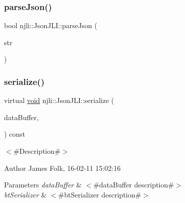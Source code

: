 \mbox{\label{classnjli_1_1_json_j_l_i_ac6c67daeea7d4b60ca3cd20f7a8403d5}} 
\subsubsection{\texorpdfstring{parse\+Json()}{parseJson()}}
{\footnotesize\ttfamily bool njli\+::\+Json\+J\+L\+I\+::parse\+Json (\begin{DoxyParamCaption}\item[{const char $\ast$}]{str }\end{DoxyParamCaption})}

\mbox{\label{classnjli_1_1_json_j_l_i_aa1e476cfc10ae610e4c9b8a62a5c2114}} 
\subsubsection{\texorpdfstring{serialize()}{serialize()}}
{\footnotesize\ttfamily virtual \mbox{\hyperlink{_thread_8h_af1e856da2e658414cb2456cb6f7ebc66}{void}} njli\+::\+Json\+J\+L\+I\+::serialize (\begin{DoxyParamCaption}\item[{\mbox{\hyperlink{_thread_8h_af1e856da2e658414cb2456cb6f7ebc66}{void}} $\ast$}]{data\+Buffer,  }\item[{bt\+Serializer $\ast$}]{ }\end{DoxyParamCaption}) const\hspace{0.3cm}{\ttfamily [virtual]}}



$<$\#\+Description\#$>$ 

\begin{DoxyAuthor}{Author}
James Folk, 16-\/02-\/11 15\+:02\+:16
\end{DoxyAuthor}

\begin{DoxyParams}{Parameters}
{\em data\+Buffer} & $<$\#data\+Buffer description\#$>$ \\
\hline
{\em bt\+Serializer} & $<$\#bt\+Serializer description\#$>$ \\
\hline
\end{DoxyParams}


